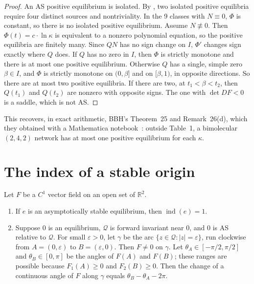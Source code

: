 \documentclass[11pt,a4paper]{report}
\providecommand{\R}{\mathbb{R}}
\newcommand{\Q}{\mathcal{Q}}
\newcommand{\indx}{\operatorname{ind}}
\begin{document}
\begin{proof}
An AS positive equilibrium is isolated. By , two isolated positive equilibria require four distinct
sources and nontriviality. In the 9 classes with \(N\equiv0\), \(\Phi\) is constant, so there is no isolated positive
equilibrium. Assume \(N\not\equiv0\). Then \(\Phi(t)=c\cdot\ln\kappa\) is equivalent to a nonzero polynomial
equation, so the positive equilibria are finitely many. Since \(QN\) has no sign change on \(I\), \(\Phi'\) changes
sign exactly where \(Q\) does. If \(Q\) has no zero in \(I\), then \(\Phi\) is strictly monotone and there is at most
one positive equilibrium. Otherwise \(Q\) has a single, simple zero \(\beta\in I\), and \(\Phi\) is strictly monotone
on \((0,\beta]\) and on \([\beta,1)\), in opposite directions. So there are at most two positive equilibria. If there
are two, at \(t_1<\beta<t_2\), then \(Q(t_1)\) and \(Q(t_2)\) are nonzero with opposite signs. The one with
\(\det DF<0\) is a saddle, which is not AS.
\end{proof}

This recovers, in exact arithmetic, BBH's Theorem~25 and Remark~26(d), which they obtained with a Mathematica
notebook~\autocite{BorosRepo}: outside Table~1, a bimolecular \((2,4,2)\) network has at most one positive
equilibrium for each \(\kappa\).

\section{The index of a stable origin}

\begin{lemma}\label{lem:kras}
Let \(F\) be a \(C^1\) vector field on an open set of \(\R^2\).
\begin{enumerate}
\item If \(e\) is an asymptotically stable equilibrium, then \(\indx(e)=1\).
\item Suppose \(0\) is an equilibrium, \(\Q\) is forward invariant near \(0\), and \(0\) is AS relative to \(\Q\).
For small \(\varepsilon>0\), let \(\gamma\) be the arc \(\{z\in\Q:|z|=\varepsilon\}\), run clockwise from
\(A=(0,\varepsilon)\) to \(B=(\varepsilon,0)\). Then \(F\neq0\) on \(\gamma\). Let \(\theta_A\in[-\pi/2,\pi/2]\) and
\(\theta_B\in[0,\pi]\) be the angles of \(F(A)\) and \(F(B)\); these ranges are possible because \(F_1(A)\ge0\) and
\(F_2(B)\ge0\). Then the change of a continuous angle of \(F\) along \(\gamma\) equals \(\theta_B-\theta_A-2\pi\).
\end{enumerate}
\end{lemma}
\end{document}

